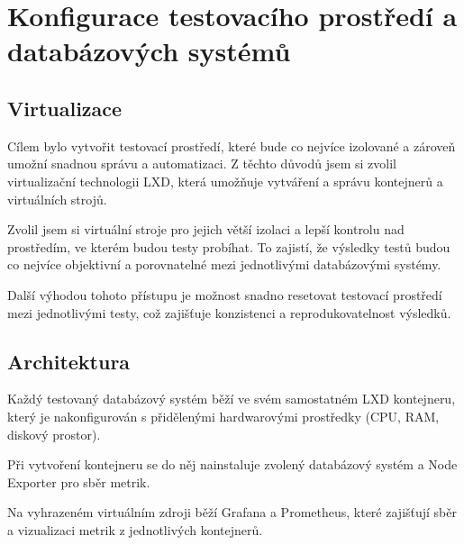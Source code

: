 \section{Konfigurace testovacího prostředí a databázových systémů}

\subsection{Virtualizace}
Cílem bylo vytvořit testovací prostředí, které bude co nejvíce izolované a zároveň umožní snadnou správu a automatizaci.
Z těchto důvodů jsem si zvolil virtualizační technologii LXD, která umožňuje vytváření a správu kontejnerů a virtuálních strojů.

Zvolil jsem si virtuální stroje pro jejich větší izolaci a lepší kontrolu nad prostředím, ve kterém budou testy probíhat.
To zajistí, že výsledky testů budou co nejvíce objektivní a porovnatelné mezi jednotlivými databázovými systémy.

Další výhodou tohoto přístupu je možnost snadno resetovat testovací prostředí mezi jednotlivými testy, což zajišťuje konzistenci a reprodukovatelnost výsledků.
\subsection{Architektura}
Každý testovaný databázový systém běží ve svém samostatném LXD kontejneru, který je nakonfigurován s přidělenými hardwarovými prostředky (CPU, RAM, diskový prostor).

Při vytvoření kontejneru se do něj nainstaluje zvolený databázový systém a Node Exporter pro sběr metrik.

Na vyhrazeném virtuálním zdroji běží Grafana a Prometheus, které zajišťují sběr a vizualizaci metrik z jednotlivých kontejnerů.

